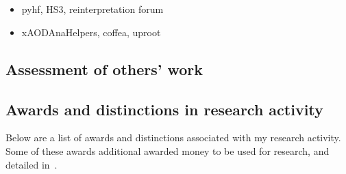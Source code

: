 \\

\\


\begin{itemize}
	\item pyhf, HS3, reinterpretation forum
\end{itemize}


\begin{itemize}
	\item xAODAnaHelpers, coffea, uproot
\end{itemize}

\subsection{Assessment of others’ work \noneyet}\label{ssec:assessment-of-others-work-noneyet}
\subsection{Awards and distinctions in research activity}\label{ssec:awards-and-distinctions-in-research-activity}

Below are a list of awards and distinctions associated with my research activity. Some of these awards additional awarded money to be used for research, and detailed in~.

